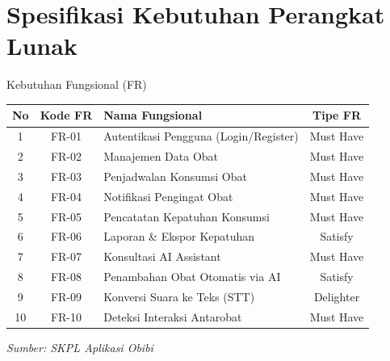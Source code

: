 \documentclass[10pt, aspectratio=169]{beamer}
\begin{document}
\section{Spesifikasi Kebutuhan Perangkat Lunak}

\begin{frame}{Kebutuhan Fungsional (FR)}
    \begin{table}[]
    \tiny
    \begin{tabular}{|c|c|p{}|c|}
        \hline
        \textbf{No} & \textbf{Kode FR} & \textbf{Nama Fungsional} & \textbf{Tipe FR} \\
        \hline
        1 & FR-01 & Autentikasi Pengguna (Login/Register) & Must Have \\
        2 & FR-02 & Manajemen Data Obat & Must Have \\
        3 & FR-03 & Penjadwalan Konsumsi Obat & Must Have \\
        4 & FR-04 & Notifikasi Pengingat Obat & Must Have \\
        5 & FR-05 & Pencatatan Kepatuhan Konsumsi & Must Have \\
        6 & FR-06 & Laporan \& Ekspor Kepatuhan & Satisfy \\
        7 & FR-07 & Konsultasi AI Assistant & Must Have \\
        8 & FR-08 & Penambahan Obat Otomatis via AI & Satisfy \\
        9 & FR-09 & Konversi Suara ke Teks (STT) & Delighter \\
        10 & FR-10 & Deteksi Interaksi Antarobat & Must Have \\
        \hline
    \end{tabular}
    \end{table}
    \vspace{0.1cm}
    \begin{flushright}
        \tiny{\textit{Sumber: SKPL Aplikasi Obibi}}
    \end{flushright}
\end{frame}
\end{document}
